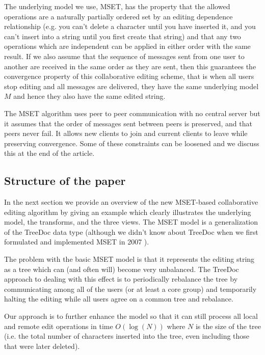 \documentclass{amsart}
\begin{document}
The underlying model we use, MSET, has the property that the allowed operations are a naturally partially ordered set  by an editing dependence relationship (e.g. you can't delete a character until you have inserted it, and you can't insert into a string until you first create that string)
and that any two operations which are independent can be applied in either order with the same result.  If we also assume that the sequence of messages sent from one user to another are received in the same order as they are sent, then this guarantees the convergence property of this collaborative editing scheme, that is when all users stop editing and all messages are delivered, they have the same underlying model $M$ and hence they also have the same edited string.

The MSET algorithm uses peer to peer communication with no central server but it assumes that  the order of messages sent between peers is preserved, and that peers never fail. It allows new clients to join and current clients to leave while preserving convergence. Some of these constraints can be loosened and we discuss this at the end of the article.

\subsection{Structure of the paper}

In the next section we provide an overview of the new MSET-based
collaborative editing algorithm by giving an example which clearly illustrates
the underlying model, the transforms, and the three views. The MSET model is a generalization of the TreeDoc data type (although we didn't know about TreeDoc when we first formulated and implemented MSET in 2007 \cite{granville_collabed_2007}).

The problem with the basic MSET model is that it represents the editing string as a tree which can (and often will) become very unbalanced.  The TreeDoc approach to dealing with this effect is to periodically rebalance the tree by communicating among all of the users (or at least a core group) and temporarily halting the editing while all users agree on a common tree and rebalance. 

Our approach is to further enhance the model so that it can still process all local and remote edit operations in time $O(\log(N))$ where $N$ is the size of the tree (i.e. the total number of characters inserted into the tree, even including those that were later deleted).
\end{document}
